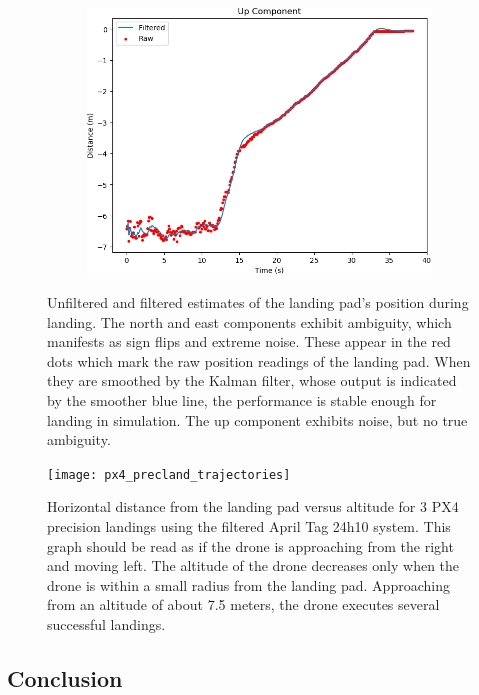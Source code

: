 \begin{figure}
    \begin{subfigure}[b]{0.49\textwidth}
         \centering
         \includegraphics[width=\textwidth]{images/landing_apriltag24h10_up}
    \end{subfigure}
    \caption{Unfiltered and filtered estimates of the landing pad's position during landing. The north and east components exhibit ambiguity, which manifests as sign flips and extreme noise.
    These appear in the red dots which mark the raw position readings of the landing pad. When they are smoothed by the Kalman filter, whose output is indicated by the smoother blue line,
    the performance is stable enough for landing in simulation. The up component exhibits noise, but no true ambiguity.}
    \label{figure:filtered_unfiltered_apriltag_24h10}
\end{figure}

\begin{figure}
    \centering
    \texttt{[image: px4\_precland\_trajectories]}
    \caption{Horizontal distance from the landing pad versus altitude for 3 PX4 precision landings using the filtered April Tag 24h10 system.
    This graph should be read as if the drone is approaching from the right and moving left. The altitude of the drone decreases only when the drone is within a small radius
    from the landing pad. Approaching from an altitude of about 7.5 meters, the drone executes several successful landings.}
    \label{figure:px4_precland_trajectories}
\end{figure}

\subsection{Conclusion}

